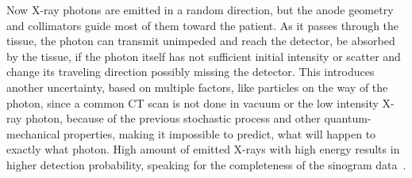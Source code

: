 \documentclass[12pt,a4paper]{article}
\begin{document}
Now  X-ray photons are emitted in a random direction, but the anode geometry and collimators guide most of them toward the patient. As it passes through the tissue, the photon can transmit unimpeded and reach the detector, be absorbed by the tissue, if the photon itself has not sufficient initial intensity or scatter and change its traveling direction possibly missing the detector. This introduces another uncertainty, based on multiple factors, like particles on the way of the photon, since a common CT scan is not done in vacuum or the low intensity X-ray photon, because of the previous stochastic process and other quantum-mechanical properties, making it impossible to predict, what will happen to exactly what photon. High amount of emitted X-rays with high energy results in higher detection probability, speaking for the completeness of the sinogram data~\cite{Seibert_2004}.
\end{document}
